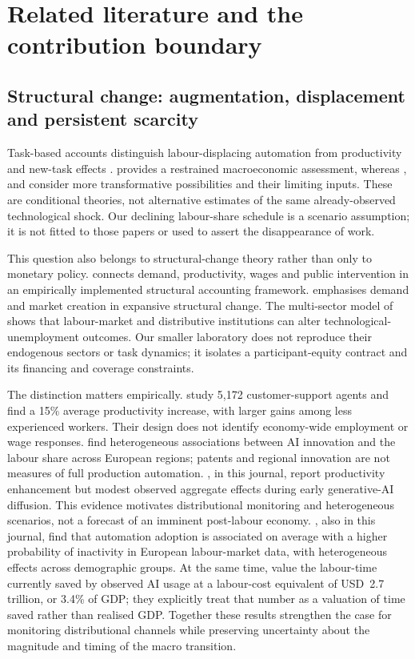 \section{Related literature and the contribution boundary}
\subsection{Structural change: augmentation, displacement and persistent scarcity}
Task-based accounts distinguish labour-displacing automation from productivity and new-task effects \citep{acemoglu2018}. \citet{acemoglu2024} provides a restrained macroeconomic assessment, whereas \citet{trammell2026}, \citet{restrepo2025} and \citet{jones2026} consider more transformative possibilities and their limiting inputs. These are conditional theories, not alternative estimates of the same already-observed technological shock. Our declining labour-share schedule is a scenario assumption; it is not fitted to those papers or used to assert the disappearance of work.

This question also belongs to structural-change theory rather than only to monetary policy. \citet{wirkierman2023} connects demand, productivity, wages and public intervention in an empirically implemented structural accounting framework. \citet{gualerzi2026} emphasises demand and market creation in expansive structural change. The multi-sector model of \citet{dosi2022} shows that labour-market and distributive institutions can alter technological-unemployment outcomes. Our smaller laboratory does not reproduce their endogenous sectors or task dynamics; it isolates a participant-equity contract and its financing and coverage constraints.

The distinction matters empirically. \citet{brynjolfsson2025} study 5,172 customer-support agents and find a 15\% average productivity increase, with larger gains among less experienced workers. Their design does not identify economy-wide employment or wage responses. \citet{minniti2025} find heterogeneous associations between AI innovation and the labour share across European regions; patents and regional innovation are not measures of full production automation. \citet{katz2026}, in this journal, report productivity enhancement but modest observed aggregate effects during early generative-AI diffusion. This evidence motivates distributional monitoring and heterogeneous scenarios, not a forecast of an imminent post-labour economy. \citet{lamperti2026}, also in this journal, find that automation adoption is associated on average with a higher probability of inactivity in European labour-market data, with heterogeneous effects across demographic groups. At the same time, \citet{fannguyen2026} value the labour-time currently saved by observed AI usage at a labour-cost equivalent of USD~2.7 trillion, or 3.4\% of GDP; they explicitly treat that number as a valuation of time saved rather than realised GDP. Together these results strengthen the case for monitoring distributional channels while preserving uncertainty about the magnitude and timing of the macro transition.


